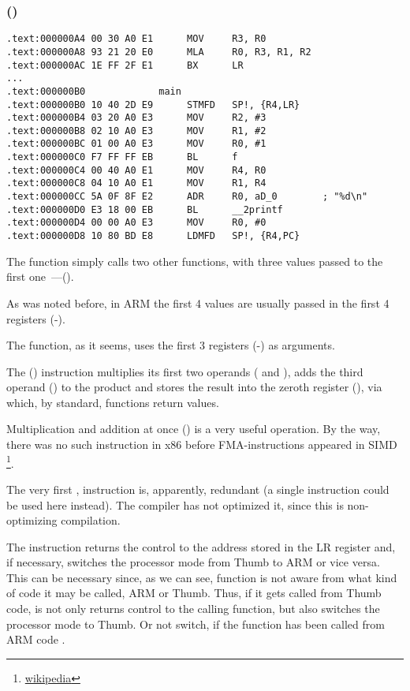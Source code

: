 \subsubsection{\NonOptimizingKeilVI (\ARMMode)}

\begin{lstlisting}[style=customasmARM]
.text:000000A4 00 30 A0 E1      MOV     R3, R0
.text:000000A8 93 21 20 E0      MLA     R0, R3, R1, R2
.text:000000AC 1E FF 2F E1      BX      LR
...
.text:000000B0             main
.text:000000B0 10 40 2D E9      STMFD   SP!, {R4,LR}
.text:000000B4 03 20 A0 E3      MOV     R2, #3
.text:000000B8 02 10 A0 E3      MOV     R1, #2
.text:000000BC 01 00 A0 E3      MOV     R0, #1
.text:000000C0 F7 FF FF EB      BL      f
.text:000000C4 00 40 A0 E1      MOV     R4, R0
.text:000000C8 04 10 A0 E1      MOV     R1, R4
.text:000000CC 5A 0F 8F E2      ADR     R0, aD_0        ; "%d\n"
.text:000000D0 E3 18 00 EB      BL      __2printf
.text:000000D4 00 00 A0 E3      MOV     R0, #0
.text:000000D8 10 80 BD E8      LDMFD   SP!, {R4,PC}
\end{lstlisting}

The \main function simply calls two other functions, with three values passed to the 
first one~---(\ttf).

As was noted before, in ARM the first 4 values are usually passed in the first 4 registers (-).

The \ttf function, as it seems, uses the first 3 registers (-) as arguments.

The  () 
instruction multiplies its first two operands ( and ), adds the third operand () to the product and stores
the result into the zeroth register (), via which, by standard, functions return values.

Multiplication and addition at once () 
is a very useful operation. By the way, there was no such instruction in x86 
before FMA-instructions appeared in SIMD
\footnote{\href{http://go.yurichev.com/17103}{wikipedia}}.

The very first , 
instruction is, apparently, redundant (a single  instruction could be used here instead). 
The compiler has not optimized it, since this is non-optimizing compilation.


The  instruction returns the control to the address stored in the \ac{LR} register and, if necessary, 
switches the processor mode from Thumb to ARM or vice versa.
This can be necessary since, as we can see, function \ttf is not aware from what kind of code it may be
called, ARM or Thumb.
Thus, if it gets called from Thumb code, 
 is not only returns control to the calling function,
but also switches the processor mode to Thumb.
Or not switch, if the function has been called from ARM code .
